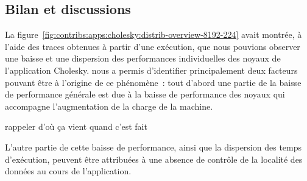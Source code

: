 \subsection{Bilan et discussions}

La figure~\ref{fig:contribs:apps:cholesky:distrib-overview-8192-224} avait montrée, à l'aide des traces obtenues à partir d'une exécution, que nous pouvions observer une baisse et une dispersion des performances individuelles des noyaux de l'application Cholesky.
\outil nous a permis d'identifier principalement deux facteurs pouvant être à l'origine de ce phénomène~: tout d'abord une partie de la baisse de performance générale est due à la baisse de performance des noyaux qui accompagne l'augmentation de la charge de la machine.
\begin{todo}
  rappeler d'où ça vient quand c'est fait
\end{todo}
L'autre partie de cette baisse de performance, ainsi que la dispersion des temps d'exécution, peuvent être attribuées à une absence de contrôle de la localité des données au cours de l'application.
